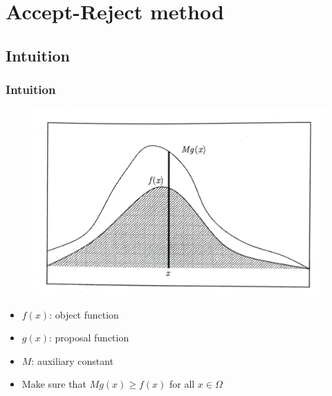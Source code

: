 \section{Accept-Reject method}
\subsection{Intuition}

\begin{frame}
    \frametitle{Intuition}

    \begin{figure}
        \begin{center}
            \includegraphics[width = .58\linewidth]{image1.png}
        \end{center}
    \end{figure}

    \begin{itemize}
        \item \(f(x)\): object function
        \item \(g(x)\): proposal function
        \item \(M\): auxiliary constant
        \item Make sure that \(Mg(x)\geq f(x)\) for all \(x \in \Omega\)
    \end{itemize}

\end{frame}
